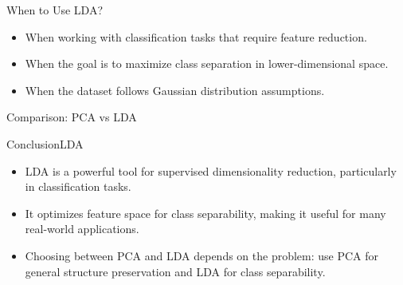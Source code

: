 \documentclass[11pt]{beamer}
\begin{document}
\begin{frame}{When to Use LDA?}
    \begin{itemize}
        \item When working with classification tasks that require feature reduction.
        \item When the goal is to maximize class separation in lower-dimensional space.
        \item When the dataset follows Gaussian distribution assumptions.
    \end{itemize}
\end{frame}

\begin{frame}{Comparison: PCA vs LDA}
\end{frame}

\begin{frame}{Conclusion}{LDA}
    \begin{itemize}
        \item LDA is a powerful tool for supervised dimensionality reduction, particularly in classification tasks.
        \item It optimizes feature space for class separability, making it useful for many real-world applications.
        \item Choosing between PCA and LDA depends on the problem: use PCA for general structure preservation and LDA for class separability.
    \end{itemize}
\end{frame}
\end{document}
